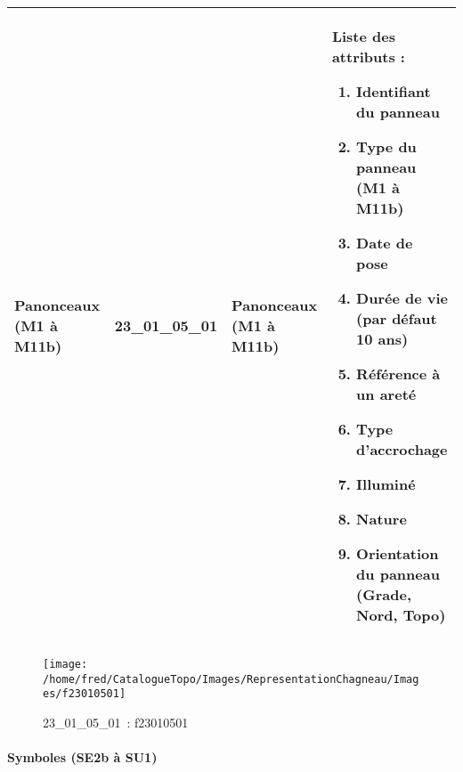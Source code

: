 \documentclass[12pt,titlepage]{book}
\begin{document}
\renewcommand{\arraystretch}{1.2}
\begin{supertabular}{|p{10cm}|c|p{13cm}|p{12cm}|}
 Panonceaux (M1 à M11b) & 23\_01\_05\_01 & Panonceaux (M1 à M11b) & Liste des attributs :
\begin{enumerate}
  \item Identifiant du panneau  \item Type du panneau (M1 à M11b)  \item Date de pose  \item Durée de vie (par défaut 10 ans)  \item Référence à un areté  \item Type d'accrochage  \item Illuminé  \item Nature  \item Orientation du panneau (Grade, Nord, Topo)\end{enumerate}
\\
\hline
\end{supertabular}
\begin{figure}[h!]
  \hfill         %
  \begin{minipage}[t]{3cm}
    \begin{center}
      \texttt{[image: /home/fred/CatalogueTopo/Images/RepresentationChagneau/Images/f23010501]}
      \caption[~23\_01\_05\_01]{\small{23\_01\_05\_01~:} \tiny{f23010501}}\label{f23010501}
    \end{center}
  \end{minipage}
\end{figure}


\paragraph{Symboles (SE2b à SU1)}
\noindent
\vspace{\baselineskip}
\end{document}
